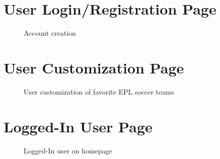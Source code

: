 \section{User Login/Registration Page}
\begin{figure}[!ht]
      \centering
      \caption{Account creation}	
\end{figure}

\section{User Customization Page}
\begin{figure}[!ht]
      \centering
      \caption{User customization of favorite EPL soccer teams}	
\end{figure}

\newpage
\section{Logged-In User Page}
\begin{figure}[!ht]
      \centering
      \caption{Logged-In user on homepage}	
\end{figure}